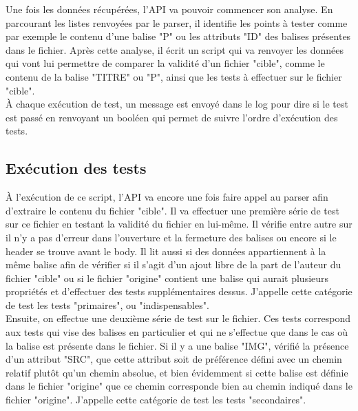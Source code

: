 Une fois les données récupérées, l'API va pouvoir commencer son analyse. En parcourant les listes renvoyées par le parser, il identifie les points à tester comme par exemple le contenu d'une balise "P" ou les attributs "ID" des balises présentes dans le fichier. Après cette analyse, il écrit un script qui va renvoyer les données qui vont lui permettre de comparer la validité d'un fichier "cible", comme le contenu de la balise "TITRE" ou "P", ainsi que les tests à effectuer sur le fichier "cible".\\

À chaque exécution de test, un message est envoyé dans le log pour dire si le test est passé en renvoyant un booléen qui permet de suivre l'ordre d'exécution des tests.\\

\subsection{Exécution des tests}

À l'exécution de ce script, l'API va encore une fois faire appel au parser afin d'extraire le contenu du fichier "cible". Il va effectuer une première série de test sur ce fichier en testant la validité du fichier en lui-même. Il vérifie entre autre sur il n'y a pas d'erreur dans l'ouverture et la fermeture des balises ou encore si le header se trouve avant le body. Il lit aussi si des données appartiennent à la même balise afin de vérifier si il s'agit d'un ajout libre de la part de l'auteur du fichier "cible" ou si le fichier "origine" contient une balise qui aurait plusieurs propriétés et d'effectuer des tests supplémentaires dessus. J'appelle cette catégorie de test les tests "primaires", ou "indispensables".\\

Ensuite, on effectue une deuxième série de test sur le fichier. Ces tests correspond aux tests qui vise des balises en particulier et qui ne s'effectue que dans le cas où la balise est présente dans le fichier. Si il y a une balise "IMG", vérifié la présence d'un attribut "SRC", que cette attribut soit de préférence défini avec un chemin relatif plutôt qu'un chemin absolue, et bien évidemment si cette balise est définie dans le fichier "origine" que ce chemin corresponde bien au chemin indiqué dans le fichier "origine". J'appelle cette catégorie de test les tests "secondaires".\\

